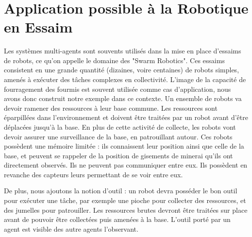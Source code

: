 	\section{Application possible à la Robotique en Essaim}
	
		\paragraph{}
			Les systèmes multi-agents sont souvents utilisés dans la mise en place d'essaims de robots, ce qu'on appelle le domaine des "Swarm Robotics". Ces essaims consistent en une grande quantité (dizaines, voire centaines) de robots simples, amenés à exécuter des tâches complexes en collectivité. L'image de la capacité de fourragement des fourmis est souvent utilisée comme cas d'application, nous avons donc construit notre exemple dans ce contexte. Un ensemble de robots va devoir ramener des ressources à leur base commune. Les ressources sont éparpillées dans l'environnement et doivent être traitées par un robot avant d'être déplacées jusqu'à la base. En plus de cette activité de collecte, les robots vont devoir assurer une surveillance de la base, en patrouillant autour. Ces robots possèdent une mémoire limitée : ils connaissent leur position ainsi que celle de la base, et peuvent se rappeler de la position de gisements de minerai qu'ils ont directement observés. Ils ne peuvent pas communiquer entre eux. Ils possèdent en revanche des capteurs leurs permettant de se voir entre eux.
			
		De plus, nous ajoutons la notion d'outil : un robot devra posséder le bon outil pour exécuter une tâche, par exemple une pioche pour collecter des ressources, et des jumelles pour patrouiller. Les ressources brutes devront être traitées sur place avant de pouvoir être collectées puis amenées à la base. L'outil porté par un agent est visible des autre agents l'observant.

